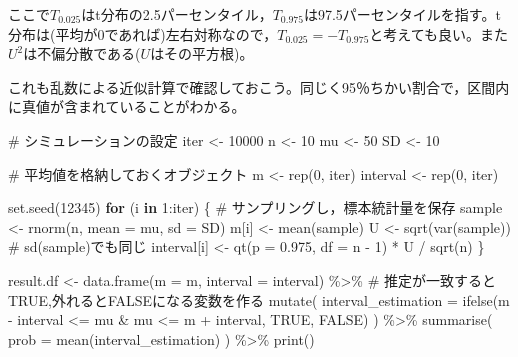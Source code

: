 \documentclass[
  a4paper,
]{ltjsbook}
\newenvironment{Shaded}{\begin{snugshade}}{\end{snugshade}}
\newcommand{\AttributeTok}[1]{\textcolor[rgb]{0.40,0.45,0.13}{#1}}
\newcommand{\CommentTok}[1]{\textcolor[rgb]{0.37,0.37,0.37}{#1}}
\newcommand{\ConstantTok}[1]{\textcolor[rgb]{0.56,0.35,0.01}{#1}}
\newcommand{\ControlFlowTok}[1]{\textcolor[rgb]{0.00,0.23,0.31}{\textbf{#1}}}
\newcommand{\DecValTok}[1]{\textcolor[rgb]{0.68,0.00,0.00}{#1}}
\newcommand{\FloatTok}[1]{\textcolor[rgb]{0.68,0.00,0.00}{#1}}
\newcommand{\FunctionTok}[1]{\textcolor[rgb]{0.28,0.35,0.67}{#1}}
\newcommand{\NormalTok}[1]{\textcolor[rgb]{0.00,0.23,0.31}{#1}}
\newcommand{\OtherTok}[1]{\textcolor[rgb]{0.00,0.23,0.31}{#1}}
\newcommand{\SpecialCharTok}[1]{\textcolor[rgb]{0.37,0.37,0.37}{#1}}
\begin{document}
ここで\(T_{0.025}\)はt分布の2.5パーセンタイル，\(T_{0.975}\)は97.5パーセンタイルを指す。t分布は(平均が0であれば)左右対称なので，\(T_{0.025}=-T_{0.975}\)と考えても良い。また\(U^2\)は不偏分散である(\(U\)はその平方根)。

これも乱数による近似計算で確認しておこう。同じく95％ちかい割合で，区間内に真値が含まれていることがわかる。

\begin{Shaded}
\begin{Highlighting}[]
\CommentTok{\# シミュレーションの設定}
\NormalTok{iter }\OtherTok{\textless{}{-}} \DecValTok{10000}
\NormalTok{n }\OtherTok{\textless{}{-}} \DecValTok{10}
\NormalTok{mu }\OtherTok{\textless{}{-}} \DecValTok{50}
\NormalTok{SD }\OtherTok{\textless{}{-}} \DecValTok{10}

\CommentTok{\# 平均値を格納しておくオブジェクト}
\NormalTok{m }\OtherTok{\textless{}{-}} \FunctionTok{rep}\NormalTok{(}\DecValTok{0}\NormalTok{, iter)}
\NormalTok{interval }\OtherTok{\textless{}{-}} \FunctionTok{rep}\NormalTok{(}\DecValTok{0}\NormalTok{, iter)}

\FunctionTok{set.seed}\NormalTok{(}\DecValTok{12345}\NormalTok{)}
\ControlFlowTok{for}\NormalTok{ (i }\ControlFlowTok{in} \DecValTok{1}\SpecialCharTok{:}\NormalTok{iter) \{}
  \CommentTok{\# サンプリングし，標本統計量を保存}
\NormalTok{  sample }\OtherTok{\textless{}{-}} \FunctionTok{rnorm}\NormalTok{(n, }\AttributeTok{mean =}\NormalTok{ mu, }\AttributeTok{sd =}\NormalTok{ SD)}
\NormalTok{  m[i] }\OtherTok{\textless{}{-}} \FunctionTok{mean}\NormalTok{(sample)}
\NormalTok{  U }\OtherTok{\textless{}{-}} \FunctionTok{sqrt}\NormalTok{(}\FunctionTok{var}\NormalTok{(sample)) }\CommentTok{\# sd(sample)でも同じ}
\NormalTok{  interval[i] }\OtherTok{\textless{}{-}} \FunctionTok{qt}\NormalTok{(}\AttributeTok{p =} \FloatTok{0.975}\NormalTok{, }\AttributeTok{df =}\NormalTok{ n }\SpecialCharTok{{-}} \DecValTok{1}\NormalTok{) }\SpecialCharTok{*}\NormalTok{ U }\SpecialCharTok{/} \FunctionTok{sqrt}\NormalTok{(n)}
\NormalTok{\}}

\NormalTok{result.df }\OtherTok{\textless{}{-}} \FunctionTok{data.frame}\NormalTok{(}\AttributeTok{m =}\NormalTok{ m, }\AttributeTok{interval =}\NormalTok{ interval) }\SpecialCharTok{\%\textgreater{}\%}
  \CommentTok{\# 推定が一致するとTRUE,外れるとFALSEになる変数を作る}
  \FunctionTok{mutate}\NormalTok{(}
    \AttributeTok{interval\_estimation =} \FunctionTok{ifelse}\NormalTok{(m }\SpecialCharTok{{-}}\NormalTok{ interval }\SpecialCharTok{\textless{}=}\NormalTok{ mu }\SpecialCharTok{\&}\NormalTok{ mu }\SpecialCharTok{\textless{}=}\NormalTok{ m }\SpecialCharTok{+}\NormalTok{ interval, }\ConstantTok{TRUE}\NormalTok{, }\ConstantTok{FALSE}\NormalTok{)}
\NormalTok{  ) }\SpecialCharTok{\%\textgreater{}\%}
  \FunctionTok{summarise}\NormalTok{(}
    \AttributeTok{prob =} \FunctionTok{mean}\NormalTok{(interval\_estimation)}
\NormalTok{  ) }\SpecialCharTok{\%\textgreater{}\%}
  \FunctionTok{print}\NormalTok{()}
\end{Highlighting}
\end{Shaded}
\end{document}
